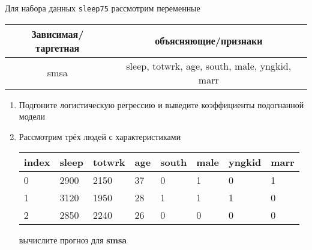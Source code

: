 \begin{exercise}
Для набора данных \texttt{sleep75} рассмотрим переменные
\begin{center}
	\begin{tabular}{|c|c|} \hline
		Зависимая/таргетная & объясняющие/признаки \\ \hline
		smsa & sleep, totwrk, age, south, male, yngkid, marr \\ \hline
	\end{tabular}
\end{center}
\begin{enumerate}
	\item Подгоните логистическую регрессию и выведите коэффициенты подогнанной модели
	\item Рассмотрим трёх людей с характеристиками
	\begin{center}
		\begin{tabular}{|l||l|l|l|l|l|l|l|}\hline
			index & sleep & totwrk & age & south & male & yngkid & marr \\ \hline\hline
			0 & 2900 & 2150 & 37 & 0 & 1 &  0 & 1 \\
			1 & 3120 & 1950 & 28 & 1 & 1 &  1 & 0 \\
			2 & 2850 & 2240 & 26 & 0 & 0 &  0 & 0 \\ \hline
		\end{tabular}
	\end{center}
	вычислите прогноз для \textbf{smsa} 
\end{enumerate}
\end{exercise}

